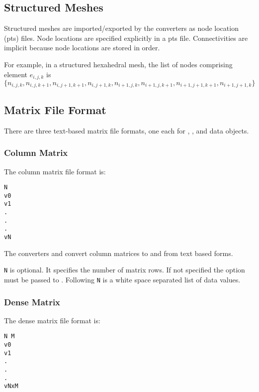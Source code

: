 \subsection{Structured Meshes}

Structured meshes are imported/exported by the converters as node
location (pts) files.  Node locations are specified explicitly in a
pts file. Connectivities are implicit because node locations are
stored in  order.

For example, in a structured hexahedral mesh, the list of nodes comprising
element \(e_{i,j,k}\) is \(\{n_{i,j,k}, n_{i,j,k+1}, n_{i,j+1,k+1}, n_{i,j+1,k}, n_{i+1,j,k}, n_{i+1,j,k+1}, n_{i+1,j+1,k+1}, n_{i+1,j+1,k}\}\)

\subsection{Matrix File Format}
\label{sec:matrix_fmt}

There are three text-based matrix file formats, one each for
, , and
 data objects.


\subsubsection{Column Matrix}

The  column matrix file format is:

\begin{verbatim}
N
v0 
v1
.
.
.
vN
\end{verbatim}

The converters  and  
convert column matrices to and from text based forms.

\verb|N| is optional.  It specifies the number of matrix rows.  If not
specified the  option must be passed to
.  Following \verb|N| is a white space
separated list of data values.


\subsubsection{Dense Matrix}

The dense matrix file format is:

\begin{verbatim}
N M
v0
v1
.
.
.
vNxM
\end{verbatim}

